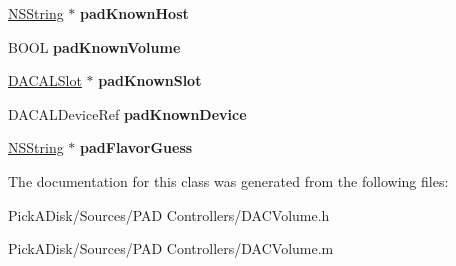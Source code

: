 \begin{DoxyCompactItemize}
\item 
\hypertarget{interface_d_a_c_volume_a046328c1a58b75b67c050a706bc6964a}{
\hyperlink{class_n_s_string}{NSString} $\ast$ {\bfseries padKnownHost}}
\label{interface_d_a_c_volume_a046328c1a58b75b67c050a706bc6964a}

\item 
\hypertarget{interface_d_a_c_volume_af1b69301c18bb358bc0182d30e01227a}{
BOOL {\bfseries padKnownVolume}}
\label{interface_d_a_c_volume_af1b69301c18bb358bc0182d30e01227a}

\item 
\hypertarget{interface_d_a_c_volume_adc9dd5b9c1fe2b62a479a4fbe6d60700}{
\hyperlink{interface_d_a_c_a_l_slot}{DACALSlot} $\ast$ {\bfseries padKnownSlot}}
\label{interface_d_a_c_volume_adc9dd5b9c1fe2b62a479a4fbe6d60700}

\item 
\hypertarget{interface_d_a_c_volume_ac4394ed828f239c13e28819f4bb99ef5}{
DACALDeviceRef {\bfseries padKnownDevice}}
\label{interface_d_a_c_volume_ac4394ed828f239c13e28819f4bb99ef5}

\item 
\hypertarget{interface_d_a_c_volume_abae9299fd903ba8706547127e0a5ec6b}{
\hyperlink{class_n_s_string}{NSString} $\ast$ {\bfseries padFlavorGuess}}
\label{interface_d_a_c_volume_abae9299fd903ba8706547127e0a5ec6b}

\end{DoxyCompactItemize}


The documentation for this class was generated from the following files:\begin{DoxyCompactItemize}
\item 
PickADisk/Sources/PAD Controllers/DACVolume.h\item 
PickADisk/Sources/PAD Controllers/DACVolume.m\end{DoxyCompactItemize}
